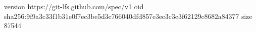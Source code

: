 version https://git-lfs.github.com/spec/v1
oid sha256:9f9a3c33f1b31e0f7ec3be5d3c766040dfd857e3ec3c3c3f62129c8682a84377
size 87544
